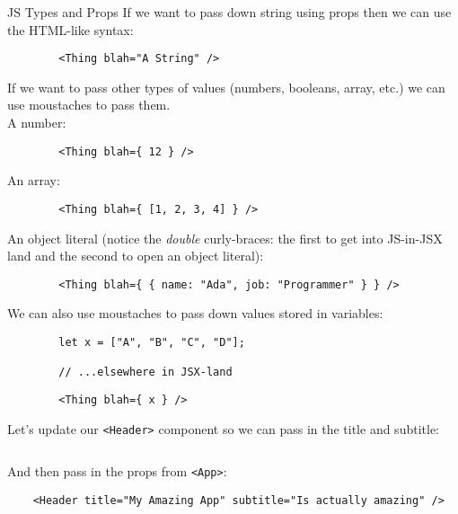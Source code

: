 \begin{infobox}{JS Types and Props}
    If we want to pass down string using props then we can use the HTML-like syntax:

    \begin{verbatim}
        <Thing blah="A String" />
    \end{verbatim}

    If we want to pass other types of values (numbers, booleans, array, etc.) we can use moustaches to pass them.
    \\

    A number:

    \begin{verbatim}
        <Thing blah={ 12 } />
    \end{verbatim}

    An array:

    \begin{verbatim}
        <Thing blah={ [1, 2, 3, 4] } />
    \end{verbatim}

    An object literal (notice the \textit{double} curly-braces: the first to get into JS-in-JSX land and the second to open an object literal):

    \begin{verbatim}
        <Thing blah={ { name: "Ada", job: "Programmer" } } />
    \end{verbatim}

    We can also use moustaches to pass down values stored in variables:

    \begin{verbatim}
        let x = ["A", "B", "C", "D"];

        // ...elsewhere in JSX-land
    \end{verbatim}
    \begin{verbatim}
        <Thing blah={ x } />
    \end{verbatim}
\end{infobox}


\pagebreak


Let's update our \texttt{<Header>} component so we can pass in the title and subtitle:

\inputminted{jsx}{01/figures/03/06-Header.jsx}

And then pass in the props from \texttt{<App>}:

\begin{verbatim}
    <Header title="My Amazing App" subtitle="Is actually amazing" />
\end{verbatim}



